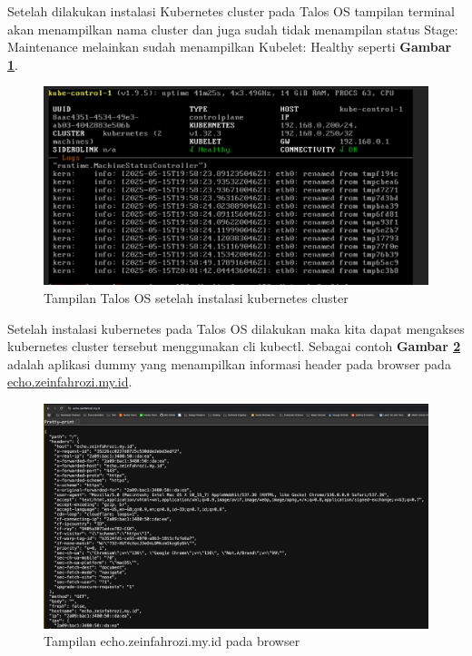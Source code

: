 Setelah dilakukan instalasi Kubernetes cluster pada Talos OS tampilan terminal
akan menampilkan nama cluster dan juga sudah tidak menampilan status Stage:
Maintenance melainkan sudah menampilkan Kubelet: Healthy seperti \textbf{Gambar
  \ref{fig:talos_install_11}}.

\begin{figure}[!ht]
  \centering
  \includegraphics[width=1\textwidth]{figures/talos-install-11.jpg}
  \caption{Tampilan Talos OS setelah instalasi kubernetes cluster}
  \label{fig:talos_install_11}
\end{figure}

\newpage

Setelah instalasi kubernetes pada Talos OS dilakukan maka kita dapat mengakses
kubernetes cluster tersebut menggunakan cli kubectl. Sebagai contoh
\textbf{Gambar \ref{fig:echo_web}} adalah aplikasi dummy yang menampilkan
informasi header pada browser pada \url{echo.zeinfahrozi.my.id}.

\begin{figure}[!ht]
  \centering
  \includegraphics[width=1\textwidth]{figures/echo-web.jpg}
  \caption{Tampilan echo.zeinfahrozi.my.id pada browser}
  \label{fig:echo_web}
\end{figure}

